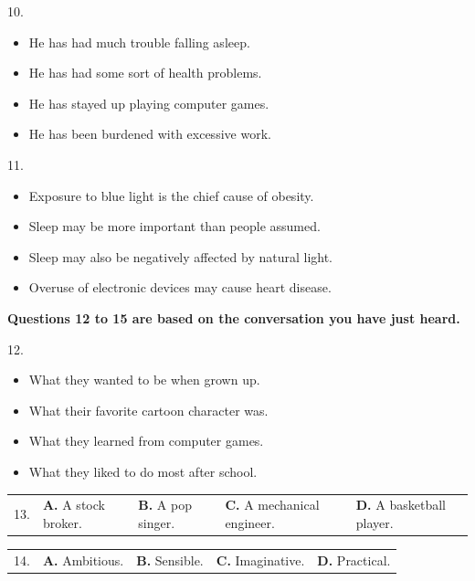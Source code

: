 \documentclass[UTF8,11pt]{ctexart}
\begin{document}
10.


\begin{itemize}[leftmargin=2em,itemsep=.2em,topsep=.4em]\item[A.] He has had much trouble falling asleep.
\item[B.] He has had some sort of health problems.
\item[C.] He has stayed up playing computer games.
\item[D.] He has been burdened with excessive work.
\end{itemize}

11.


\begin{itemize}[leftmargin=2em,itemsep=.2em,topsep=.4em]\item[A.] Exposure to blue light is the chief cause of obesity.
\item[B.] Sleep may be more important than people assumed.
\item[C.] Sleep may also be negatively affected by natural light.
\item[D.] Overuse of electronic devices may cause heart disease.
\end{itemize}

\textbf{Questions 12 to 15 are based on the conversation you have just heard.}


12.


\begin{itemize}[leftmargin=2em,itemsep=.2em,topsep=.4em]\item[A.] What they wanted to be when grown up.
\item[B.] What their favorite cartoon character was.
\item[C.] What they learned from computer games.
\item[D.] What they liked to do most after school.
\end{itemize}

\noindent\begin{tabularx}{\linewidth}{@{}lXXXX@{}}13. & \textbf{A.} A stock broker. & \textbf{B.} A pop singer. & \textbf{C.} A mechanical engineer. & \textbf{D.} A basketball player.\\\end{tabularx}\par

\noindent\begin{tabularx}{\linewidth}{@{}lXXXX@{}}14. & \textbf{A.} Ambitious. & \textbf{B.} Sensible. & \textbf{C.} Imaginative. & \textbf{D.} Practical.\\\end{tabularx}\par
\end{document}
